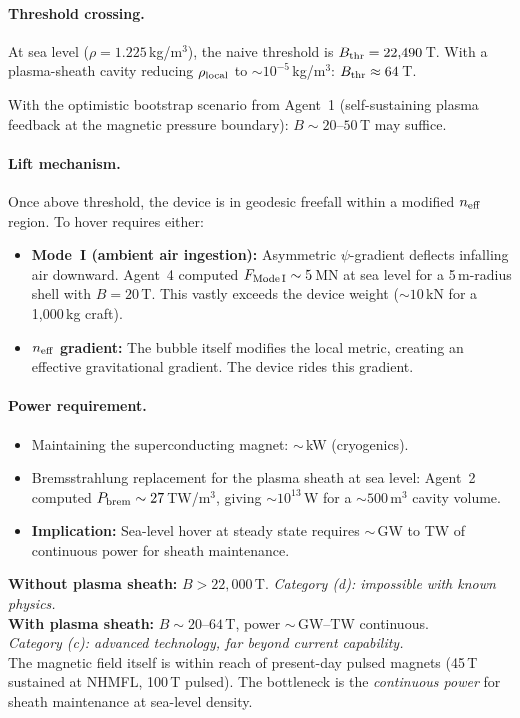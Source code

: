 \documentclass[12pt,a4paper]{article}
\begin{document}
\paragraph{Threshold crossing.}
At sea level ($\rho = 1.225$\,kg/m$^3$), the naive threshold is
$B_{\rm thr} = 22{,}490$\,T.  With a plasma-sheath cavity reducing
$\rho_{\rm local}$ to $\sim 10^{-5}$\,kg/m$^3$: $B_{\rm thr} \approx 64$\,T.

With the optimistic bootstrap scenario from Agent~1 (self-sustaining
plasma feedback at the magnetic pressure boundary): $B \sim 20$--$50$\,T
may suffice.

\paragraph{Lift mechanism.}
Once above threshold, the device is in geodesic freefall within a modified
$n_{\rm eff}$ region.  To hover requires either:
\begin{itemize}
\item \textbf{Mode~I (ambient air ingestion):} Asymmetric $\psi$-gradient
  deflects infalling air downward.  Agent~4 computed $F_{\rm Mode\,I} \sim 5$\,MN
  at sea level for a 5\,m-radius shell with $B = 20$\,T.  This vastly exceeds
  the device weight ($\sim 10$\,kN for a 1{,}000\,kg craft).
\item \textbf{$n_{\rm eff}$ gradient:} The bubble itself modifies the local
  metric, creating an effective gravitational gradient.  The device rides this
  gradient.
\end{itemize}

\paragraph{Power requirement.}
\begin{itemize}
\item Maintaining the superconducting magnet: $\sim$\,kW (cryogenics).
\item Bremsstrahlung replacement for the plasma sheath at sea level:
  Agent~2 computed $P_{\rm brem} \sim 27$\,TW/m$^3$, giving
  $\sim 10^{13}$\,W for a $\sim 500$\,m$^3$ cavity volume.
\item \textbf{Implication:} Sea-level hover at steady state requires
  $\sim$\,GW to TW of continuous power for sheath maintenance.
\end{itemize}

\begin{tcolorbox}[colback=yellow!5!white, colframe=yellow!60!black,
  title=Sea-Level Hover Assessment]
\textbf{Without plasma sheath:} $B > 22{,}000$\,T.
\emph{Category (d): impossible with known physics.}\\[4pt]
\textbf{With plasma sheath:} $B \sim 20$--$64$\,T,
power $\sim$\,GW--TW continuous.\\
\emph{Category (c): advanced technology, far beyond current capability.}\\[4pt]
The magnetic field itself is within reach of present-day pulsed magnets
(45\,T sustained at NHMFL, 100\,T pulsed).  The bottleneck is the
\emph{continuous power} for sheath maintenance at sea-level density.
\end{tcolorbox}
\end{document}
